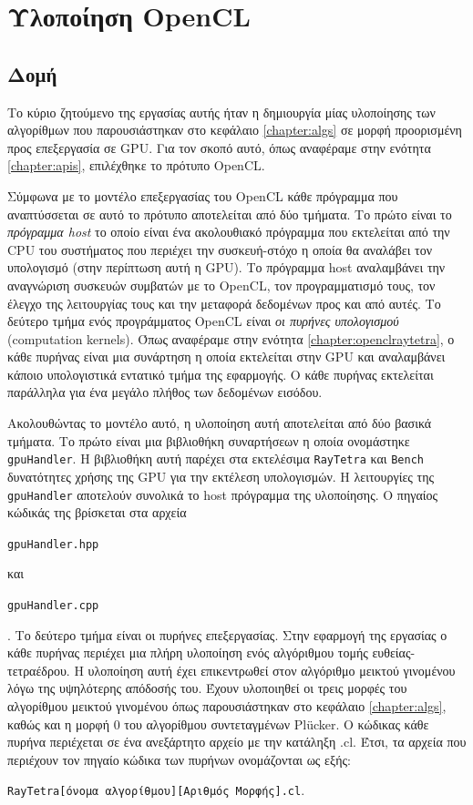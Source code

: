 \section{Υλοποίηση OpenCL}

\subsection{Δομή}

\noindent Το κύριο ζητούμενο της εργασίας αυτής ήταν η δημιουργία μίας υλοποίησης των αλγορίθμων που παρουσιάστηκαν στο κεφάλαιο \ref{chapter:algs} σε μορφή προορισμένη προς επεξεργασία σε GPU. Για τον σκοπό αυτό, όπως αναφέραμε στην ενότητα \ref{chapter:apis}, επιλέχθηκε το πρότυπο OpenCL. 

Σύμφωνα με το μοντέλο επεξεργασίας του OpenCL \cite{OpenCLSpec} κάθε πρόγραμμα που αναπτύσσεται σε αυτό το πρότυπο αποτελείται από δύο τμήματα. Το πρώτο είναι το \textit{πρόγραμμα host} το οποίο είναι ένα ακολουθιακό πρόγραμμα που εκτελείται από την CPU του συστήματος που περιέχει την  συσκευή-στόχο η οποία θα αναλάβει τον υπολογισμό (στην περίπτωση αυτή η GPU). Το πρόγραμμα host αναλαμβάνει την αναγνώριση συσκευών συμβατών με το OpenCL, τον προγραμματισμό τους, τον έλεγχο της λειτουργίας τους και την μεταφορά δεδομένων προς και από αυτές. Το δεύτερο τμήμα ενός προγράμματος OpenCL είναι \textit{οι πυρήνες υπολογισμού} (computation kernels). Όπως αναφέραμε στην ενότητα \ref{chapter:openclraytetra}, ο κάθε πυρήνας είναι μια συνάρτηση η οποία εκτελείται στην GPU και αναλαμβάνει κάποιο υπολογιστικά εντατικό τμήμα της εφαρμογής. Ο κάθε πυρήνας εκτελείται παράλληλα για ένα μεγάλο πλήθος των δεδομένων εισόδου.  

Ακολουθώντας το μοντέλο αυτό, η υλοποίηση αυτή αποτελείται από δύο βασικά τμήματα. Το πρώτο είναι μια βιβλιοθήκη συναρτήσεων η οποία ονομάστηκε \verb!gpuHandler!. H βιβλιοθήκη αυτή παρέχει στα εκτελέσιμα \verb!RayTetra! και \verb!Bench! δυνατότητες χρήσης της GPU για την εκτέλεση υπολογισμών. Η λειτουργίες της \verb!gpuHandler! αποτελούν συνολικά το host πρόγραμμα της υλοποίησης. Ο πηγαίος κώδικάς της βρίσκεται στα αρχεία \begin{english}\verb!gpuHandler.hpp!\end{english} και \begin{english}\verb!gpuHandler.cpp!\end{english}. Το δεύτερο τμήμα είναι οι πυρήνες επεξεργασίας. Στην εφαρμογή της εργασίας ο κάθε πυρήνας περιέχει μια πλήρη υλοποίηση ενός αλγόριθμου τομής ευθείας-τετραέδρου. Η υλοποίηση αυτή έχει επικεντρωθεί στον αλγόριθμο μεικτού γινομένου λόγω της υψηλότερης απόδοσής του. Έχουν υλοποιηθεί οι τρεις μορφές του αλγορίθμου μεικτού γινομένου όπως παρουσιάστηκαν στο κεφάλαιο \ref{chapter:algs}, καθώς και η μορφή 0 του αλγορίθμου συντεταγμένων Plücker. Ο κώδικας κάθε πυρήνα περιέχεται σε ένα ανεξάρτητο 
αρχείο με την κατάληξη .cl. Έτσι, τα αρχεία που περιέχουν τον πηγαίο κώδικα των πυρήνων ονομάζονται ως εξής: \begin{center}\verb!RayTetra[όνομα αλγορίθμου][Αριθμός Μορφής].cl!.\end{center}
 
